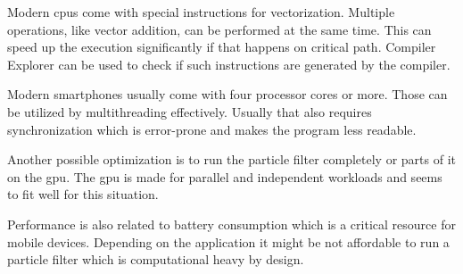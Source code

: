Modern \glspl{cpu} come with special instructions for vectorization. Multiple operations, like vector addition, can be performed at the same time. This can speed up the execution significantly if that happens on critical path. Compiler Explorer\cite{compiler_explorer} can be used to check if such instructions are generated by the compiler.

Modern smartphones usually come with four processor cores or more. Those can be utilized by multithreading effectively. Usually that also requires synchronization which is error-prone and makes the program less readable.

Another possible optimization is to run the particle filter completely or parts of it on the \gls{gpu}. The \gls{gpu} is made for parallel and independent workloads and seems to fit well for this situation.\cite{parallel_resampling}

Performance is also related to battery consumption which is a critical resource for mobile devices. Depending on the application it might be not affordable to run a particle filter which is computational heavy by design.

